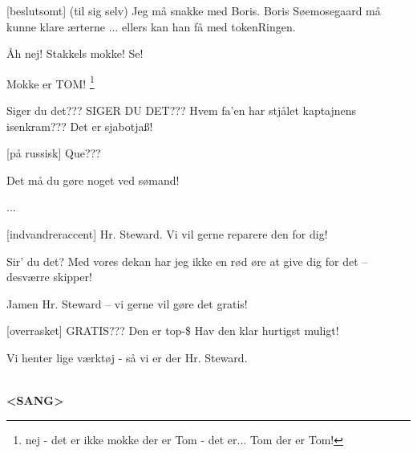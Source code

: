 \documentclass[a4paper,11pt]{article}
\begin{document}
\begin{sketch}



 [beslutsomt] (til sig selv) Jeg må snakke med Boris. Boris
Søemosegaard må kunne klare ærterne  ... ellers kan
han få med tokenRingen.


 Åh nej! Stakkels mokke!  Se!

 Mokke er TOM! \footnote{nej - det er ikke mokke der er Tom -
det er... Tom der er Tom!}

 Siger du det??? SIGER DU DET??? Hvem fa'en har stjålet
kaptajnens isenkram??? Det er sjabotjaß!

 [på russisk] Que???

 Det må du gøre noget ved sømand!

 ...


 [indvandreraccent] Hr. Steward. Vi vil gerne reparere den
for dig!

 Sir' du det? Med vores dekan har jeg ikke en rød øre at give dig for det --
desværre skipper!

 Jamen Hr. Steward -- vi gerne vil gøre det gratis!

 [overrasket] GRATIS???  Den er top-\$ Hav den klar
hurtigst muligt!

 Vi henter lige værktøj - så vi er der Hr. Steward.

\\

\large{\textbf{<SANG>}} 



\end{sketch}
\end{document}
